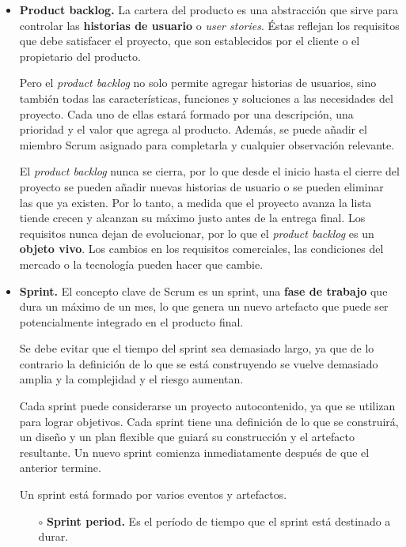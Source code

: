 \begin{itemize}
\item \textbf{Product backlog.} La cartera del producto es una abstracción que sirve para controlar las \textbf{historias de usuario} o \textit{user stories}. Éstas reflejan los requisitos que debe satisfacer el proyecto, que son establecidos por el cliente o el propietario del producto. 

Pero el \textit{product backlog} no solo permite agregar historias de usuarios, sino también todas las características, funciones y soluciones a las necesidades del proyecto. Cada uno de ellas estará formado por una descripción, una prioridad y el valor que agrega al producto. Además, se puede añadir el miembro Scrum asignado para completarla y cualquier observación relevante.

El \textit{product backlog} nunca se cierra, por lo que desde el inicio hasta el cierre del proyecto se pueden añadir nuevas historias de usuario o se pueden eliminar las que ya existen. Por lo tanto, a medida que el proyecto avanza la lista tiende crecen y alcanzan su máximo justo antes de la entrega final. Los requisitos nunca dejan de evolucionar, por lo que el \textit{product backlog} es un \textbf{objeto vivo}. Los cambios en los requisitos comerciales, las condiciones del mercado o la tecnología pueden hacer que cambie.
    
\item \textbf{Sprint.} El concepto clave de Scrum es un sprint, una \textbf{fase de trabajo} que dura un máximo de un mes, lo que genera un nuevo artefacto que puede ser potencialmente integrado en el producto final.

Se debe evitar que el tiempo del sprint sea demasiado largo, ya que de lo contrario la definición de lo que se está construyendo se vuelve demasiado amplia y la complejidad  y el riesgo aumentan.

Cada sprint puede considerarse un proyecto autocontenido, ya que se utilizan para lograr objetivos. Cada sprint tiene una definición de lo que se construirá, un diseño y un plan flexible que guiará su construcción y el artefacto resultante. Un nuevo sprint comienza inmediatamente después de que el anterior termine.

Un sprint está formado por varios eventos y artefactos.

\begin{itemize}

    \item [$\circ$] \textbf{Sprint period.} Es el período de tiempo que el sprint está destinado a durar.
        

\end{itemize}
\end{itemize}
